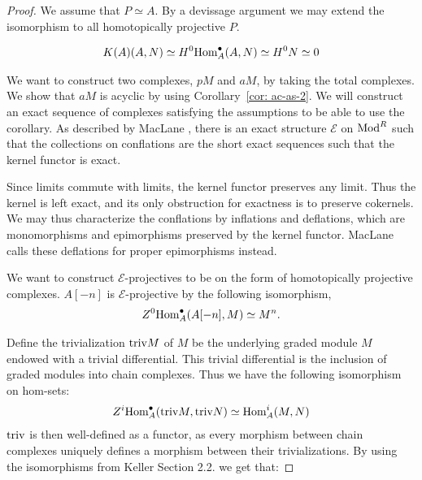 \documentclass[../thesis.tex]{subfiles}
\begin{document}
            \begin{proof}
                We assume that $P \simeq A$. By a devissage argument we may extend the isomorphism to all homotopically projective $P$. 

                \begin{align*}
                    K(A)(A, N) \simeq H^0 {\tt{Hom}}^\bullet_A (A, N) \simeq H^0 N \simeq 0
                \end{align*}

                We want to construct two complexes, $pM$ and $aM$, by taking the total complexes. We show that $aM$ is acyclic by using Corollary~\ref{cor: ac-as-2}. We will construct an exact sequence of complexes satisfying the assumptions to be able to use the corollary. As described by MacLane \cite{MacLane94}, there is an exact structure $\mathcal{E}$ on $\tt{Mod}^R$ such that the collections on conflations are the short exact sequences such that the kernel functor is exact.
                \begin{center}
                \end{center}

                Since limits commute with limits, the kernel functor preserves any limit. Thus the kernel is left exact, and its only obstruction for exactness is to preserve cokernels. We may thus characterize the conflations by inflations and deflations, which are monomorphisms and epimorphisms preserved by the kernel functor. MacLane calls these deflations for proper epimorphisms instead.

                We want to construct $\mathcal{E}$-projectives to be on the form of homotopically projective complexes. $A[-n]$ is $\mathcal{E}$-projective by the following isomorphism,
                \begin{align*}
                    Z^0\tt{Hom}_A^\bullet (A[-n], M) \simeq M^n\tt{.}
                \end{align*}

                Define the trivialization $\tt{triv}M$ of $M$ be the underlying graded module $M$ endowed with a trivial differential. This trivial differential is the inclusion of graded modules into chain complexes. Thus we have the following isomorphism on hom-sets:
                \begin{align*}
                    Z^i\tt{Hom}_A^\bullet(\tt{triv}M, \tt{triv}N) \simeq \tt{Hom}_A^i(M, N)
                \end{align*}
                $\tt{triv}$ is then well-defined as a functor, as every morphism between chain complexes uniquely defines a morphism between their trivializations. By using the isomorphisms from Keller \cite{Keller94} Section 2.2. we get that:


\end{proof}
\end{document}
